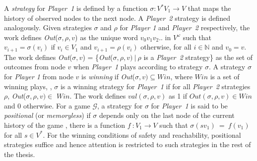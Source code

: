 A \textit{strategy} for \textit{Player~1} is defined by a function $
\sigma : V^{*}V_{1} \rightarrow V $ that maps the history of observed
nodes to the next node. A \textit{Player~2} strategy is defined
analogously. Given strategies $\sigma$ and $\rho$ for \textit{Player
	1} and \textit{Player~2} respectively, the work defines \textit{Out}($
\sigma, \rho, v$) as the unique word $v_{0} v_{1} v_{2}..$ in
$V^{\omega}$ such that $v_{i+1} = \sigma(v_{i})$ if $v_{i} \in V_{1}$
and $v_{i+1} = \rho(v_{i})$ otherwise, for all $i \in \mathbb{N}$ and
$v_{0} = v$. The work defines \textit{Out}($\sigma,v$) = \{\textit{Out}($
\sigma, \rho, v) \: | \: \rho$ is a \textit{Player~2} strategy\} as
the set of outcomes from node $v$ when \textit{Player~1} plays
according to strategy $\sigma$. A strategy $\sigma$ for \textit{Player
	1} from node $v$ is \textit{winning} if \textit{Out}($\sigma,v)
\subseteq \mathit{\mathit{Win}}$, where $\mathit{\mathit{Win}}$ is a set of winning
plays, \ie, $\sigma$ is a winning strategy for \textit{Player~1} if
for all \textit{Player~2} strategies $\rho$, \textit{Out}($ \sigma,
\rho, v) \in$ $\mathit{\mathit{Win}}$. The work defines $val(\sigma,\rho,v)$ as 1 if
$Out(\sigma, \rho, v) \in \mathit{\mathit{Win}}$ and 0 otherwise.  For a game
$\mathcal{G}$, a strategy for $\sigma$ for \textit{Player~1} is said
to be \textit{positional} (or \textit{memoryless}) if $\sigma$ depends
only on the last node of the current history of the game \ie, there
is a function $f\: : V_{1} \rightarrow V $ such that
$\sigma(sv_{1})\:= \:f(v_{1})$ for all $s \in V^{*}$. For the winning
conditions of safety and reachability, positional strategies suffice
and hence attention is restricted to such strategies in the rest of the thesis.

